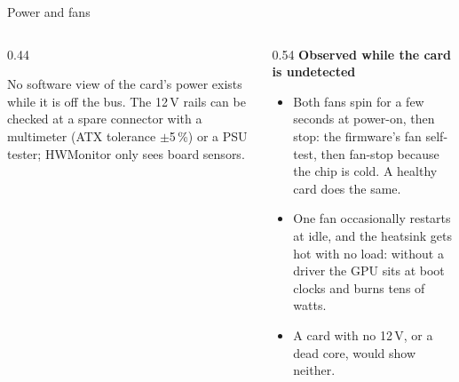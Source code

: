 \documentclass[aspectratio=169,11pt]{beamer}
\begin{document}
\begin{frame}{Power and fans}
  \begin{columns}[T,onlytextwidth]
    \begin{column}{0.44\textwidth}
      \centering
      \par\medskip\scriptsize\raggedright
      No software view of the card's power exists while it is off the bus. The 12\,V rails can be
      checked at a spare connector with a multimeter (ATX tolerance $\pm$5\,\%) or a PSU tester;
      HWMonitor only sees board sensors.
    \end{column}
    \begin{column}{0.54\textwidth}
      \footnotesize
      \textbf{Observed while the card is undetected}
      \begin{itemize}\setlength{\itemsep}{0.3em}
        \item Both fans spin for a few seconds at power-on, then stop: the firmware's fan
          self-test, then fan-stop because the chip is cold. A healthy card does the same.
        \item One fan occasionally restarts at idle, and the heatsink gets hot with no load:
          without a driver the GPU sits at boot clocks and burns tens of watts.
        \item A card with no 12\,V, or a dead core, would show neither.
      \end{itemize}
    \end{column}
  \end{columns}
\end{frame}
\end{document}
